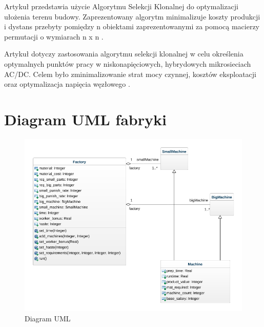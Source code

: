 \documentclass[a4paper]{article}
\begin{document}
Artykuł przedstawia użycie Algorytmu Selekcji Klonalnej do optymalizacji ułożenia terenu budowy. Zaprezentowany algorytm minimalizuje koszty produkcji i dystans przebyty pomiędzy n obiektami zaprezentowanymi za pomocą macierzy permutacji o wymiarach n x n \cite{WANG2016267}.


Artykuł dotyczy zastosowania algorytmu selekcji klonalnej w celu określenia optymalnych punktów pracy w niskonapięciowych, hybrydowych mikrosieciach AC/DC. Celem było zminimalizowanie strat mocy czynnej, kosztów eksploatacji oraz optymalizacja napięcia węzłowego \cite{rokicki}.


\section{Diagram UML fabryki}
\begin{figure}[ht]
\centering
\includegraphics[width=.7\textwidth]{UML_Model.png}
\caption{Diagram UML}
\end{figure}


\newpage
\printbibliography
\end{document}
